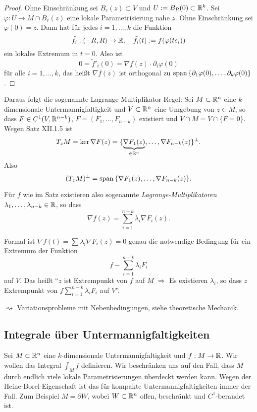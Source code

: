 \begin{proof}
 Ohne Einschränkung sei $B_r(z) \subset V$ und $U := B_R(0) \subset \mathbb{R}^k$. Sei $\varphi: U \to M \cap B_r(z)$ eine lokale Parametrisierung nahe $z$. Ohne Einschränkung sei $\varphi(0) = z$. Dann hat für jedes $i = 1, \ldots, k$ die Funktion
 \[ \tilde{f}_i:(-R,R) \to \mathbb{R}, \quad \tilde{f}_i(t) := f( \varphi(te_i) ) \]
 ein lokales Extremum in $t=0$. Also ist
 \[ 0 = \tilde{f}'_i(0) = \nabla f( z ) \cdot \partial_i \varphi(0) \]
 für alle $i = 1, \ldots, k$, das heißt $\nabla f( z )$ ist orthogonal zu $\mathrm{span}\, \{ \partial_1 \varphi(0), \ldots, \partial_k \varphi(0) \}$.
\end{proof}

\begin{rmrk}
 Daraus folgt die sogenannte Lagrange-Multiplikator-Regel: Sei $M \subset \mathbb{R}^n$ eine $k$-dimensionale Untermannigfaltigkeit und $V \subset \mathbb{R}^n$ eine Umgebung von $z \in M$, so dass $F \in C^1(V, \mathbb{R}^{n-k})$, $F = (F_1, \ldots, F_{n-k})$ existiert und $V \cap M = V \cap \{ F = 0 \}$. Wegen Satz XII.1.5 ist
 \[ T_z M = \ker \nabla F(z) = \{ \underbrace{\nabla F_1(z)}_{\in \mathbb{R}^n}, \ldots, \nabla F_{n-k}(z) \}^\perp. \]
 Also 
 \[ (T_z M)^\perp = \mathrm{span}\, \{ \nabla F_1(z), \ldots, \nabla F_{n-k}(z) \}. \]
 
 Für $f$ wie im Satz existieren also sogenannte \emph{Lagrange-Multiplikatoren} $\lambda_1, \ldots, \lambda_{n-k} \in \mathbb{R}$, so dass
 \[ \nabla f(z) = \sum_{i=1}^{n-k} \lambda_i \nabla F_i(z). \]
 
 Formal ist $\nabla f(t) = \sum \lambda_i \nabla F_i(z) = 0$ genau die notwendige Bedingung für ein Extremum der Funktion 
 \[ f - \sum_{i=1}^{n-k} \lambda_i F_i \]
 auf $V$. Das heißt ``$z$ ist Extrempunkt von $f$ auf $M$ $\Rightarrow$ Es existieren $\lambda_i$, so dass $z$ Extrempunkt von $f \sum_{i=1}^{n-k} \lambda_i F_i$ auf $V$''.
 
 $\rightsquigarrow$ Variationsprobleme mit Nebenbedingungen, siehe theoretische Mechanik.
\end{rmrk}

\subsection{Integrale über Untermannigfaltigkeiten}
Sei $M \subset \mathbb{R}^n$ eine $k$-dimensionale Untermannigfaltigkeit und $f: M \to \mathbb{R}$. Wir wollen das Integral $\int_M f$ definieren. Wir beschränken uns auf den Fall, dass $M$ durch endlich viele lokale Parametrisierungen überdeckt werden kann. Wegen der Heine-Borel-Eigenschaft ist das für kompakte Untermannigfaltigkeiten immer der Fall. Zum Beispiel $M = \partial W$, wobei $W \subset \mathbb{R}^n$ offen, beschränkt und $C^1$-berandet ist.

